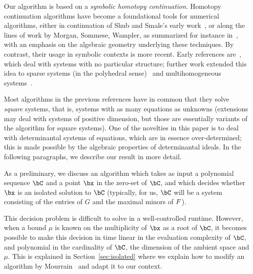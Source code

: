 \documentclass[12pt]{article}
\begin{document}

Our algorithm is based on a {\em symbolic homotopy continuation}.
Homotopy continuation algorithms have become a foundational tools for
numerical algorithms, either in continuation of Shub and Smale's early
work~\cite{ShSm93}, or along the lines of work by Morgan, Sommese,
Wampler, as summarized for instance in~\cite{SoWa05}, with an emphasis
on the algebraic geometry underlying these techniques. By contrast,
their usage in symbolic contexts is more recent. Early references
are~\cite{HeKrPuSaWa99,BoMaWaWa04}, which deal with systems with no
particular structure; further work extended this idea to sparse
systems (in the polyhedral sense)~\cite{JeMaSoWa09,HeJeSa10,HeJeSa13,HeJeSa14}
and multihomogeneous systems~\cite{HeJeSaSo02,SaSc16}.

Most algorithms in the previous references have in common that they
solve {\em square} systems, that is, systems with as many equations as
unknowns (extensions may deal with systems of positive dimension, but
those are essentially variants of the algorithm for square systems).
One of the novelties in this paper is to deal with determinantal
systems of equations, which are in essence over-determined; this is
made possible by the algebraic properties of determinantal ideals.
In the following paragraphs, we describe our result in more detail.

As a preliminary, we discuss an algorithm which takes as input a
polynomial sequence $\bC$ and a point $\bx$ in the zero-set of $\bC$,
and which decides whether $\bx$ is an isolated solution to $\bC$
(typically, for us, $\bC$ will be a system consisting of the entries
of $G$ and the maximal minors of ${F}$).

This decision problem is difficult to solve in a well-controlled
runtime. However, when a bound $\mu$ is known on the multiplicity of
$\bx$ as a root of $\bC$, it becomes possible to make this decision in
time linear in the evaluation complexity of $\bC$, and polynomial in
the cardinality of $\bC$, the dimension of the ambient space and
$\mu$. This is explained in Section~\ref{sec:isolated} where we
explain how to modify an algorithm by Mourrain~\cite{Mourrain97} and
adapt it to our context.
\end{document}
